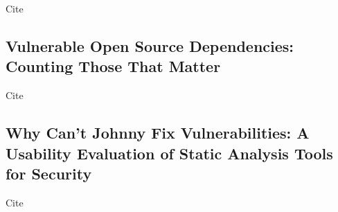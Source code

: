 Cite~\cite{watanabe2017}



\subsection{Vulnerable Open Source Dependencies: Counting Those That Matter}
\label{subsec:vulnerable-open-source-dependencies:-counting-those-that-matter}

Cite~\cite{pashchenko2018}



\subsection{Why Can’t Johnny Fix Vulnerabilities: A Usability Evaluation of Static Analysis Tools for Security}
\label{subsec:why-can’t-johnny-fix-vulnerabilities:-a-usability-evaluation-of-static-analysis-tools-for-security}

Cite~\cite{smith2020}
